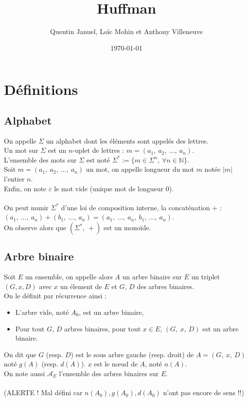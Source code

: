 \documentclass[a4paper, 12pt]{article}
\title{Huffman}
\author{Quentin Januel, Loïc Mohin et Anthony Villeneuve}
\date{\today}
\begin{document}
\maketitle
\newpage

\tableofcontents{}
\newpage

\section{Définitions}

\subsection{Alphabet}
On appelle $\Sigma$ un alphabet dont les éléments sont appelés des lettres. \\
Un mot sur $\Sigma$ est un $n$-uplet de lettres : $m = (a_1,\ a_2,\ ...,\ a_n)$. \\
L'ensemble des mots sur $\Sigma$ est noté $\Sigma^* := \{m \in \Sigma^n,\ \forall n \in \mathbb{N}\}$. \\
Soit $m = (a_1,\ a_2,\ ...,\ a_n)$ un mot, on appelle longueur du mot $m$ notée $|m|$ l'entier $n$. \\
Enfin, on note $\varepsilon$ le mot vide (unique mot de longueur $0$). \\ \\
On peut munir $\Sigma^*$ d'une loi de composition interne, la concaténation $+$ : \\
$(a_1,\ ...,\ a_n)+(b_1,\ ...,\ a_n) = (a_1,\ ...,\ a_n,\ b_1,\ ...,\ a_n)$. \\
On observe alors que $(\Sigma^*,\ +)$ est un monoïde.

\subsection{Arbre binaire}
Soit $E$ un ensemble, on appelle alors $A$ un arbre binaire sur $E$ un triplet $(G, x, D)$ avec $x$ un élement de $E$ et $G$, $D$ des arbres binaires. \\
On le définit par récurrence ainsi :
\begin{itemize}
\item L'arbre vide, noté $A_0$, est un arbre binaire,
\item Pour tout $G$, $D$ arbres binaires, pour tout $x \in E$, $(G,\ x,\ D)$ est un arbre binaire.
\end{itemize}
On dit que $G$ (resp. $D$) est le sous arbre gauche (resp. droit) de $A = (G,\ x,\ D)$ noté $g(A)$ (resp. $d(A)$). $x$ est le nœud de $A$, noté $n(A)$. \\
On note aussi $\mathcal{A}_E$ l'ensemble des arbres binaires sur $E$. \\ \\
(ALERTE ! Mal défini car $n(A_0), g(A_0), d(A_0)$ n'ont pas encore de sens !!)
\end{document}
